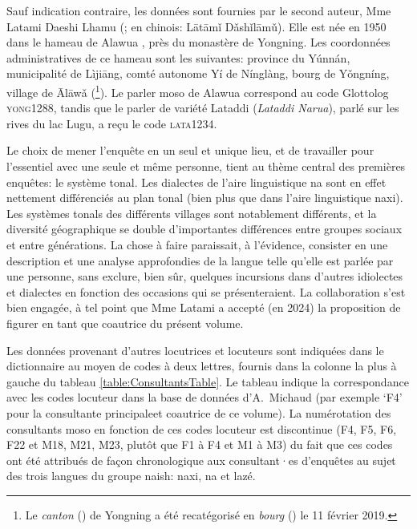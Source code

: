 Sauf indication contraire, les données sont fournies par le second auteur, Mme Latami Daeshi Lhamu (; en chinois:  Lātāmǐ Dǎshǐlāmǔ). Elle est née en 1950 dans le hameau de Alawua , près du monastère de Yongning. Les coordonnées administratives de ce hameau sont les suivantes: province du Yúnnán, municipalité de Lìjiāng, comté autonome Yí de Nínglàng, bourg de Yǒngníng, village de Ālāwǎ (\footnote{Le \emph{canton} () de Yongning a été recatégorisé en \emph{bourg} () le 11 février 2019.}). Le parler moso de Alawua correspond au code Glottolog \textsc{yong1288}, tandis que le parler de variété Lataddi (\emph{Lataddi Narua}), parlé sur les rives du lac Lugu, a reçu le code \textsc{lata1234}.

Le choix de mener l'enquête en un seul et unique lieu, et de travailler pour l'essentiel avec une seule et même personne, tient au thème central des premières enquêtes: le système tonal. Les dialectes de l'aire linguistique na sont en effet nettement différenciés au plan tonal (bien plus que dans l'aire linguistique naxi). Les systèmes tonals des différents villages sont notablement différents, et la diversité géographique se double d'importantes différences entre groupes sociaux et entre générations. La chose à faire paraissait, à l'évidence, consister en une description et une analyse approfondies de la langue telle qu'elle est parlée par une personne, sans exclure, bien sûr, quelques incursions dans d'autres idiolectes et dialectes en fonction des occasions qui se présenteraient. La collaboration s'est bien engagée, à tel point que Mme Latami a accepté (en 2024) la proposition de figurer en tant que coautrice du présent volume.

Les données provenant d'autres locutrices et locuteurs sont indiquées dans le dictionnaire au moyen de codes à deux lettres, fournis dans la colonne la plus à gauche du tableau \ref{table:ConsultantsTable}. Le tableau indique la correspondance avec les codes locuteur dans la base de données d'A.\ Michaud (par exemple `F4' pour la consultante principaleet coautrice de ce volume). La numérotation des consultants moso en fonction de ces codes locuteur est discontinue (F4, F5, F6, F22 et M18, M21, M23, plutôt que F1 à F4 et M1 à M3) du fait que ces codes ont été attribués de façon chronologique aux consultant·es d'enquêtes au sujet des trois langues du groupe naish: naxi, na et lazé.

